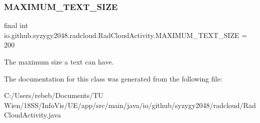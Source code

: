 \subsubsection{\texorpdfstring{M\+A\+X\+I\+M\+U\+M\+\_\+\+T\+E\+X\+T\+\_\+\+S\+I\+ZE}{MAXIMUM\_TEXT\_SIZE}}
{\footnotesize\ttfamily final int io.\+github.\+syzygy2048.\+radcloud.\+Rad\+Cloud\+Activity.\+M\+A\+X\+I\+M\+U\+M\+\_\+\+T\+E\+X\+T\+\_\+\+S\+I\+ZE = 200\hspace{0.3cm}{\ttfamily [static]}}

The maximum size a text can have. 

The documentation for this class was generated from the following file\+:\begin{DoxyCompactItemize}
\item 
C\+:/\+Users/rebeb/\+Documents/\+T\+U Wien/18\+S\+S/\+Info\+Vis/\+U\+E/app/src/main/java/io/github/syzygy2048/radcloud/Rad\+Cloud\+Activity.\+java\end{DoxyCompactItemize}
